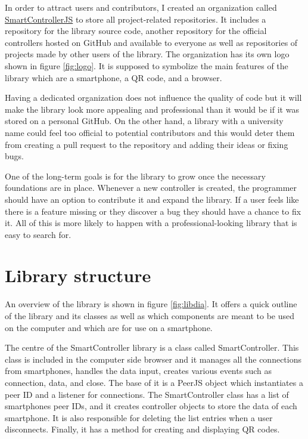 \documentclass{l4proj}
\begin{document}
In order to attract users and contributors, I created an organization called \href{https://github.com/SmartControllerJS}{SmartControllerJS} to store all project-related repositories. It includes a repository for the library source code, another repository for the official controllers hosted on GitHub and available to everyone as well as repositories of projects made by other users of the library. The organization has its own logo shown in figure \ref{fig:logo}. It is supposed to symbolize the main features of the library which are a smartphone, a QR code, and a browser. \par

Having a dedicated organization does not influence the quality of code but it will make the library look more appealing and professional than it would be if it was stored on a personal GitHub. On the other hand, a library with a university name could feel too official to potential contributors and this would deter them from creating a pull request to the repository and adding their ideas or fixing bugs. \par 

One of the long-term goals is for the library to grow once the necessary foundations are in place. Whenever a new controller is created, the programmer should have an option to contribute it and expand the library. If a user feels like there is a feature missing or they discover a bug they should have a chance to fix it. All of this is more likely to happen with a professional-looking library that is easy to search for. \par


\section{Library structure}
An overview of the library is shown in figure \ref{fig:libdia}. It offers a quick outline of the library and its classes as well as which components are meant to be used on the computer and which are for use on a smartphone.  \par
The centre of the SmartController library is a class called SmartController. This class is included in the computer side browser and it manages all the connections from smartphones, handles the data input, creates various events such as connection, data, and close. The base of it is a PeerJS object which instantiates a peer ID and a listener for connections. The SmartController class has a list of smartphones peer IDs, and it creates controller objects to store the data of each smartphone. It is also responsible for deleting the list entries when a user disconnects. Finally, it has a method for creating and displaying QR codes.\par
\end{document}
